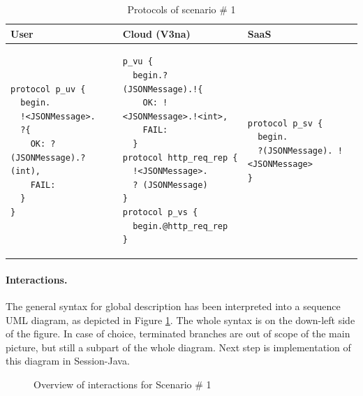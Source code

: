 \documentclass{llncs}
\begin{document}
{
\lstset{
framerule=0pt,
numbers=none
}
\begin{longtable}{|p{}|p{}|p{}|}
\caption{Protocols of scenario \# 1}
\label{tab:protocols-sc1} \\ \hline
User & Cloud (V3na) & SaaS \\ \hline
\endhead

\begin{lstlisting}
protocol p_uv { 
  begin.
  !<JSONMessage>. 
  ?{
    OK: ?(JSONMessage).?(int),
    FAIL: 
  }
}
\end{lstlisting}
&
\begin{lstlisting}
p_vu { 
  begin.?(JSONMessage).!{
    OK: !<JSONMessage>.!<int>,
    FAIL: 
  }
protocol http_req_rep {
  !<JSONMessage>.
  ? (JSONMessage)
}
protocol p_vs { 
  begin.@http_req_rep 
}
\end{lstlisting}
&
\begin{lstlisting}
protocol p_sv { 
  begin.
  ?(JSONMessage). !<JSONMessage> 
}
\end{lstlisting}
\\ \hline
\end{longtable}
}

\paragraph{Interactions.} The general syntax for global description has been interpreted into a sequence UML diagram, as depicted in Figure \ref{fig:interaction-overview-sc1}. The whole syntax is on the down-left side of the figure. In case of choice, terminated branches are out of scope of the main picture, but still a subpart of the whole diagram. Next step is implementation of this diagram in Session-Java.

\begin{figure}[ht]
\centering
{}
\caption{Overview of interactions for Scenario \# 1}
\label{fig:interaction-overview-sc1}
\end{figure}
\end{document}
